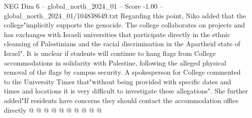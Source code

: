 \begin{textsample}{NEG Dim 6 – global\_north\_2024\_01 – Score -1.00 – global\_north\_2024\_01/104838649.txt}
Regarding this point, Niko added that the college"implicitly supports the genocide.
The college collaborates on projects and has exchanges with Israeli universities that participate directly in the ethnic cleansing of Palestinians and the racial discrimination in the Apartheid state of Israel".
It is unclear if students will continue to hang flags from College accommodations in solidarity with Palestine, following the alleged physical removal of the flags by campus security.
A spokesperson for College commented to the University Times that"without being provided with specific dates and times and locations it is very difficult to investigate these allegations".
She further added"If residents have concerns they should contact the accommodation office directly @ @ @ @ @ @ @ @ @ @

\end{textsample}
